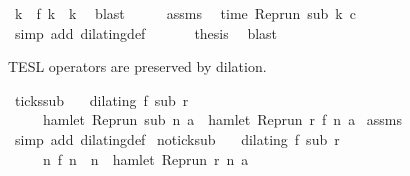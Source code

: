 \begin{isabellebody}
\ k\ \ {\isacartoucheopen}f\ k\ {\isacharequal}\ k{\isacartoucheclose}\ \isamarkupfalse%
\ blast\isanewline
\ \ \isamarkupfalse%
\ \isamarkupfalse%
\ assms{\isacharparenleft}{}{\isacharcomma}{}{\isacharparenright}\ \isamarkupfalse%
\ {\isacartoucheopen}time\ {\isacharparenleft}{\isacharparenleft}Rep{\isacharunderscore}run\ sub{\isacharparenright}\ k\ c{\isacharparenright}\ {\isacharequal}\ {\isasymtau}{\isacartoucheclose}\ \isamarkupfalse%
\ {\isacharparenleft}simp\ add{\isacharcolon}\ dilating{\isacharunderscore}def{\isacharparenright}\ \isanewline
\ \ \isamarkupfalse%
\ \isamarkupfalse%
\ {\isacharquery}thesis\ \isamarkupfalse%
\ blast\isanewline
{}\isamarkupfalse%
%
\endisatagproof
{\isafoldproof}%
%
\isadelimproof
%
\endisadelimproof
%
\begin{isamarkuptext}%
TESL operators are preserved by dilation.%
\end{isamarkuptext}\isamarkuptrue%
\isamarkupfalse%
\ ticks{\isacharunderscore}sub{\isacharcolon}\isanewline
\ \ \ {\isacartoucheopen}dilating\ f\ sub\ r{\isacartoucheclose}\isanewline
\ \ \ \ \ {\isacartoucheopen}hamlet\ {\isacharparenleft}{\isacharparenleft}Rep{\isacharunderscore}run\ sub{\isacharparenright}\ n\ a{\isacharparenright}\ {\isacharequal}\ hamlet\ {\isacharparenleft}{\isacharparenleft}Rep{\isacharunderscore}run\ r{\isacharparenright}\ {\isacharparenleft}f\ n{\isacharparenright}\ a{\isacharparenright}{\isacartoucheclose}\isanewline
%
\isadelimproof
%
\endisadelimproof
%
\isatagproof
{}\isamarkupfalse%
\ assms\ \isamarkupfalse%
\ {\isacharparenleft}simp\ add{\isacharcolon}\ dilating{\isacharunderscore}def{\isacharparenright}%
\endisatagproof
{\isafoldproof}%
%
\isadelimproof
\isanewline
%
\endisadelimproof
\isanewline
{}\isamarkupfalse%
\ no{\isacharunderscore}tick{\isacharunderscore}sub{\isacharcolon}\isanewline
\ \ \ {\isacartoucheopen}dilating\ f\ sub\ r{\isacartoucheclose}\isanewline
\ \ \ \ \ {\isacartoucheopen}{\isacharparenleft}{\isasymnexists}n\ f\ n\ {\isacharequal}\ n{\isacharparenright}\ {\isasymlongrightarrow}\ {\isasymnot}hamlet\ {\isacharparenleft}{\isacharparenleft}Rep{\isacharunderscore}run\ r{\isacharparenright}\ n\ a{\isacharparenright}{\isacartoucheclose}\isanewline

\end{isabellebody}
